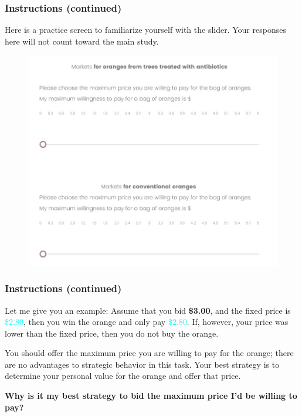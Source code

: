 \documentclass[12pt]{article}
\begin{document}
\subsubsection{\textbf{Instructions (continued)}}
 Here is a practice screen to familiarize yourself with the slider. Your responses here will not count toward the main study.

\begin{figure}[H]
    \centering
    \includegraphics[width=0.8\linewidth]{BDM_market.jpg}

\end{figure}

\clearpage


\subsubsection*{Instructions (continued)}
Let me give you an example: Assume that you bid \textbf{\$3.00}, and the fixed price is \textcolor{cyan}{\$2.80}, then you win the orange and only pay \textcolor{cyan}{\$2.80}. If, however, your price was lower than the fixed price, then you do not buy the orange.  

You should offer the maximum price you are willing to pay for the orange; there are no advantages to strategic behavior in this task. Your best strategy is to determine your personal value for the orange and offer that price.  

\vspace{0.3cm}

\textbf{Why is it my best strategy to bid the maximum price I’d be willing to pay?}  
\end{document}
